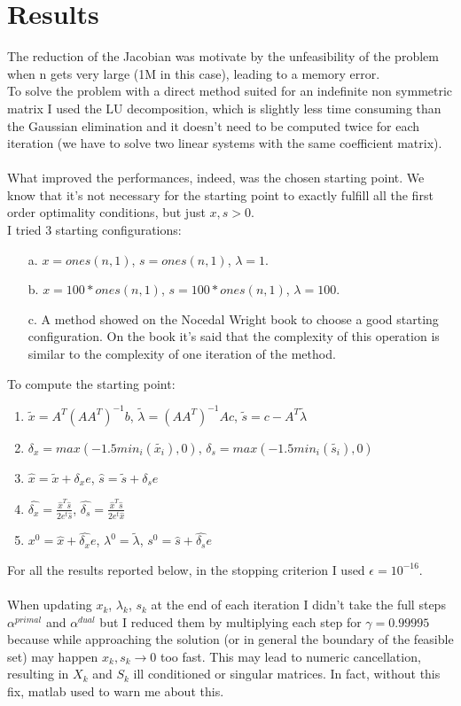\documentclass[]{article}
\begin{document}
\section{Results}
The reduction of the Jacobian was motivate by the unfeasibility of the problem when n gets very large (1M in this case), leading to a memory error.\\
To solve the problem with a direct method suited for an indefinite non symmetric matrix I used the LU decomposition, which is slightly less time consuming than the Gaussian elimination and it doesn't need to be computed twice for each iteration (we have to solve two linear systems with the same coefficient matrix).\\\\
What improved the performances, indeed, was the chosen starting point. We know that it's not necessary for the starting point to exactly fulfill all the first order optimality conditions, but just $x, s > 0$.\\
I tried 3 starting configurations:
\begin{enumerate}
	\item [a.]$x=ones(n,1)$, $s=ones(n,1)$, $\lambda = 1$.
	\item [b.]$x=100*ones(n,1)$, $s=100*ones(n,1)$,
	 $\lambda = 100$.
	 \item [c.] A method showed on the Nocedal Wright book to choose a good starting configuration. On the book it's said that the complexity of this operation is similar to the complexity of one iteration of the method.
\end{enumerate} 
To compute the starting point:
\begin{enumerate}
	\item $\tilde{x} = A^T(AA^T)^{-1}b$, $\tilde{\lambda} = (AA^T)^{-1}Ac$, $\tilde{s} = c-A^T\tilde{\lambda}$
	\item $\delta_x=max(-1.5min_i(\tilde{x_i}),0)$, $\delta_s=max(-1.5min_i(\tilde{s_i}),0)$
	\item $\hat{x} = \tilde{x} + \delta_xe$, $\hat{s} = \tilde{s} + \delta_se$
	\item $\hat{\delta_x}=\frac{\hat{x}^T\hat{s}}{2e^t\hat{s}}$, $\hat{\delta_s}=\frac{\hat{x}^T\hat{s}}{2e^t\hat{x}}$
	\item $x^0 = \hat{x} + \hat{\delta_x}e$, $\lambda^0=\tilde{\lambda}$, $s^0 = \hat{s} + \hat{\delta_s}e$
\end{enumerate}
For all the results reported below, in the stopping criterion I used $\epsilon=10^{-16}$.\\\\
When updating $x_k$, $\lambda_k$, $s_k$ at the end of each iteration I didn't take the full steps $\alpha^{primal}$ and $\alpha^{dual}$ but I reduced them by multiplying each step for $\gamma= 0.99995$ because while approaching the solution (or in general the boundary of the feasible set) may happen $x_k,s_k \to0$ too fast. This may lead to numeric cancellation, resulting in $X_k$ and $S_k$ ill conditioned or singular matrices. In fact, without this fix, matlab used to warn me about this. 
\pagebreak
\end{document}
